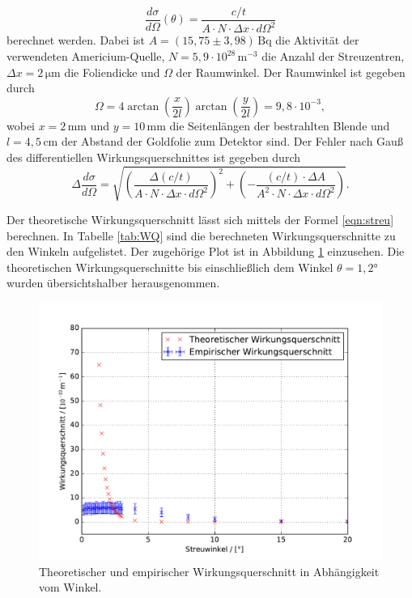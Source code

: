 \begin{equation}
  \frac{d\sigma}{d\Omega}(\theta) = \frac{c/t}{A\cdot{N}\cdot\Delta{x}\cdot d\Omega^2}
  \label{WQbla}
\end{equation}
berechnet werden.
Dabei ist $A = (15,75\pm3,98)\,\text{Bq}$ die Aktivität der verwendeten Americium-Quelle, $N = 5,9\cdot10^{28}\,\text{m}^{-3}$ die Anzahl der Streuzentren,
$\Delta{x} = 2\,\si{\micro\metre}$ die Foliendicke und $\Omega$ der Raumwinkel.
Der Raumwinkel ist gegeben durch
\begin{equation}
  \Omega = 4\arctan\left( \frac{x}{2l} \right)\arctan\left( \frac{y}{2l} \right) = 9,8\cdot10^{-3},
\end{equation}
wobei $x = 2\,\text{mm}$ und $y=10\,\text{mm}$ die Seitenlängen der bestrahlten Blende und
$l = 4,5\,\text{cm}$ der Abstand der Goldfolie zum Detektor sind.
Der Fehler nach Gauß des differentiellen Wirkungsquerschnittes ist gegeben durch
\begin{equation}
  \Delta{\frac{d\sigma}{d\Omega}} = \sqrt{ \left(\frac{\Delta(c/t)}{A\cdot{N}\cdot\Delta{x}\cdot d\Omega^2}\right)^2 + \left( -\frac{(c/t)\cdot\Delta{A}}{A^2\cdot{N}\cdot\Delta{x}\cdot d\Omega^2} \right) }.
\end{equation}

Der theoretische Wirkungsquerschnitt lässt sich mittels der Formel \eqref{eqn:streu} berechnen.
In Tabelle \ref{tab:WQ} sind die berechneten Wirkungsquerschnitte zu den Winkeln aufgelistet.
Der zugehörige Plot ist in Abbildung \ref{fig:WQ} einzusehen.
Die theoretischen Wirkungsquerschnitte bis einschließlich dem Winkel $\theta = 1,2°$ wurden übersichtshalber herausgenommen.

\begin{figure}[H]
  \centering
  \includegraphics[width=\textwidth]{WQ.pdf}
  \caption{Theoretischer und empirischer Wirkungsquerschnitt in Abhängigkeit vom Winkel.}
  \label{fig:WQ}
\end{figure}


